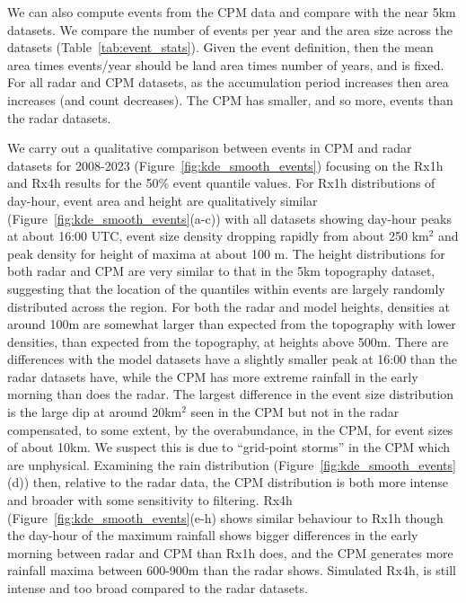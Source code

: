 \documentclass[11pt,a4paper]{article}
\begin{document}
 We can also compute events from the CPM data and compare with the near 5km datasets. We compare the number of events per year and the area size across the datasets (Table~\ref{tab:event_stats}). Given the event definition, then the mean area times events/year should be land area times number of years, and is fixed. For all radar and CPM datasets, as the accumulation period increases then area increases (and count decreases). The CPM has smaller, and so more, events than the radar datasets. 
 
  We carry out a qualitative comparison between events in  CPM and radar datasets for 2008-2023 (Figure~\ref{fig:kde_smooth_events}) focusing on the Rx1h and Rx4h results for the 50\% event quantile values. 
  For Rx1h distributions of day-hour, event area and height are qualitatively similar  (Figure~\ref{fig:kde_smooth_events}(a-c)) with all datasets showing day-hour peaks at about 16:00 UTC, event size density dropping rapidly from about 250 km$^2$ and peak density for height of maxima at about 100 m.
   The height distributions for both radar and CPM are very similar to that in the 5km topography dataset, suggesting that the location of the quantiles within events are largely  randomly distributed across the region. 
    For both the radar and model heights, densities  at around 100m are somewhat larger than expected from the topography with lower densities, than expected from the topography, at heights above 500m. 
    There are differences with the model datasets have a slightly smaller peak at 16:00 than the radar datasets have, while the CPM has more extreme rainfall in the early morning than does the radar. The largest difference in the event size distribution is the large dip at around 20km$^2$ seen in the CPM but not in the radar compensated, to some extent, by the overabundance, in the CPM, for event sizes of about 10km. We suspect this is due to ``grid-point storms'' in the CPM which are unphysical. 
     Examining the rain distribution (Figure~\ref{fig:kde_smooth_events}(d)) then, relative to the radar data, the CPM distribution is both more intense and broader with some sensitivity to filtering.  Rx4h (Figure~\ref{fig:kde_smooth_events}(e-h) shows similar behaviour to Rx1h though the day-hour of the maximum rainfall shows bigger differences in the early morning between radar and CPM than Rx1h does, and the CPM generates more rainfall maxima between 600-900m than the radar shows.  Simulated Rx4h, is still intense and too broad compared to the radar datasets. 
\end{document}
